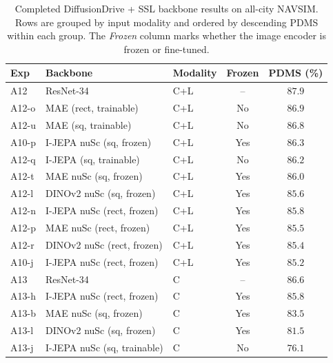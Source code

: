 \begin{table}[ht]
\centering
\caption[Completed DiffusionDrive + SSL all-city NAVSIM results.]{Completed DiffusionDrive + SSL backbone results on all-city NAVSIM. Rows are grouped by input modality and ordered by descending PDMS within each group. The \emph{Frozen} column marks whether the image encoder is frozen or fine-tuned.}
\label{tab:diffusiondrive-allcity}
\small
\renewcommand{\arraystretch}{1.15}
\setlength{\tabcolsep}{5pt}
\begin{tabular}{@{}l >{\raggedright\arraybackslash}p{3.8cm} l c c@{}}
\toprule
\textbf{Exp} & \textbf{Backbone} & \textbf{Modality} & \textbf{Frozen} & \textbf{PDMS (\%)} \\
\midrule
A12    & ResNet-34                      & C+L & --        & $\mathbf{87.9}$ \\
A12-o  & MAE (rect, trainable)          & C+L & No        & $86.9$ \\
A12-u  & MAE (sq, trainable)            & C+L & No        & $86.8$ \\
A10-p  & I-JEPA nuSc (sq, frozen)       & C+L & Yes       & $86.3$ \\
A12-q  & I-JEPA (sq, trainable)         & C+L & No        & $86.2$ \\
A12-t  & MAE nuSc (sq, frozen)          & C+L & Yes       & $86.0$ \\
A12-l  & DINOv2 nuSc (sq, frozen)       & C+L & Yes       & $85.6$ \\
A12-n  & I-JEPA nuSc (rect, frozen)     & C+L & Yes       & $85.8$ \\
A12-p  & MAE nuSc (rect, frozen)        & C+L & Yes       & $85.5$ \\
A12-r  & DINOv2 nuSc (rect, frozen)     & C+L & Yes       & $85.4$ \\
A10-j  & I-JEPA nuSc (rect, frozen)     & C+L & Yes       & $85.2$ \\
\midrule
A13    & ResNet-34                      & C   & --        & $\mathbf{86.6}$ \\
A13-h  & I-JEPA nuSc (rect, frozen)     & C   & Yes       & $85.8$ \\
A13-b  & MAE nuSc (sq, frozen)          & C   & Yes       & $83.5$ \\
A13-l  & DINOv2 nuSc (sq, frozen)       & C   & Yes       & $81.5$ \\
A13-j  & I-JEPA nuSc (sq, trainable)    & C   & No        & $76.1$ \\
\bottomrule
\end{tabular}
\end{table}


